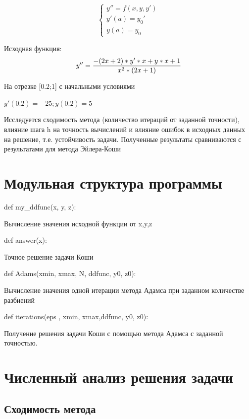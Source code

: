  \begin{equation}
 	\begin{cases}
 		y''=f(x,y,y') \\
 		y'(a)=y_{0}' \\
 		y(a) = y_{0} 	
 	\end{cases}
 \end{equation}
 
 Исходная функция: 
 \begin{equation}
 	y''=\frac{-(2x+2)*y'*x+y*x+1}{x^{2}*(2x+1)} \\
 \end{equation}
 
 На отрезке [0.2;1] с начальными условиями
 
 \begin{math}
 	y'(0.2)=-25 ;
 	y(0.2) = 5 
 \end{math}

Исследуется сходимость метода (количество итераций от заданной точности), влияние шага h на точность вычислений и влияние ошибок в исходных данных на решение, т.е. устойчивость задачи. Полученные результаты сравниваются с результатами для метода Эйлера-Коши 

\section{Модульная структура программы}

def my\_ddfunc(x, y, z):

Вычисление значения исходной функции от x,y,z

def answer(x):

Точное решение задачи Коши

def Adams(xmin, xmax, N, ddfunc, y0, z0):

Вычисление значения одной итерации метода Адамса при заданном количестве разбиений

def iterations(eps , xmin, xmax,ddfunc, y0, z0):

Получение решения задачи Коши с помощью метода Адамса с заданной точностью. 

\section{Численный анализ решения задачи}

\subsection{Сходимость метода}

